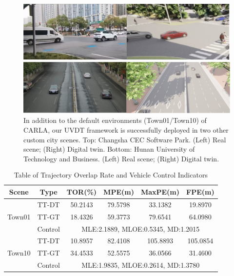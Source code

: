 \documentclass[journal,twoside,web]{ieeecolor}
\begin{document}
\begin{figure}[!t]
	\centerline{\includegraphics[width=\columnwidth]{picture/picture8.eps}}
	\caption{In addition to the default environments (Town01/Town10) of CARLA, our UVDT framework is successfully deployed in two other custom city scenes. Top: Changsha CEC Software Park. (Left) Real scene; (Right) Digital twin. Bottom: Hunan University of Technology and Business. (Left) Real scene; (Right) Digital twin.} 
	\label{fig:8} 
\end{figure}

\begin{table}[t]
	\centering
	\caption{Table of Trajectory Overlap Rate and Vehicle Control Indicators}
	\label{tab:3}
	\renewcommand\arraystretch{1.3}
	\begin{tabular}{|c|c|c|c|c|c|}
		
		\hline
		Scene & Type & TOR(\%) & MPE(m) & MaxPE(m) & FPE(m) \\
		\hline
		\multirow{3}{*}{Town01} & TT-DT & 50.2143 & 79.5798 & 33.1382 & 19.8970 \\
		\cline{2-6}
		& TT-GT & 18.4326 & 59.3773 & 79.6541 & 64.0980 \\
		\cline{2-6}
		& Control & \multicolumn{4}{|c|}{MLE:2.1889, MLOE:0.5345, MD:1.2015} \\
		\hline
		\multirow{3}{*}{Town10} & TT-DT & 10.8957 & 82.4108 & 105.8893 & 105.0854 \\
		\cline{2-6}
		& TT-GT & 34.4533 & 52.5575 & 36.0566 & 31.4600 \\
		\cline{2-6}
		& Control & \multicolumn{4}{|c|}{MLE:1.9835, MLOE:0.2614, MD:1.3780} \\	
		\hline
	\end{tabular}
\end{table}
\end{document}
